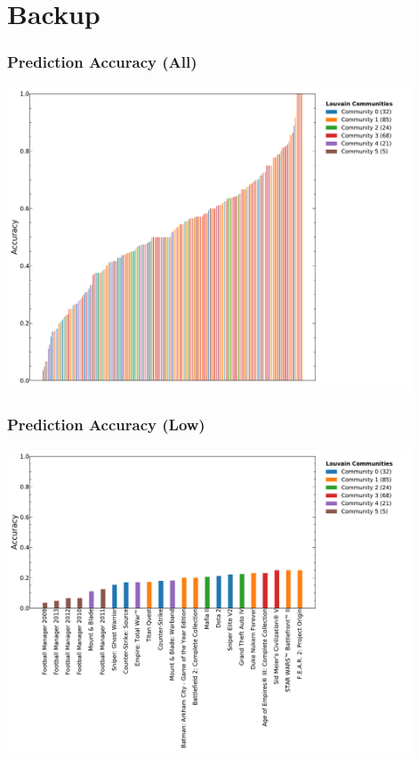 \documentclass[18pt,xcolor=table]{beamer} \usefonttheme[onlymath]{serif}
\begin{document}
\backupbegin
\section{Backup}
\sectionpage

\begin{frame}
  \frametitle{Prediction Accuracy (All)}
  \centering
  \includegraphics[width=0.9\textwidth]{../output/prediction_acc.pdf}
\end{frame}

\begin{frame}
  \frametitle{Prediction Accuracy (Low)}
  \centering
  \includegraphics[width=0.9\textwidth]{../output/prediction_acc_low.pdf}
\end{frame}
\end{document}
